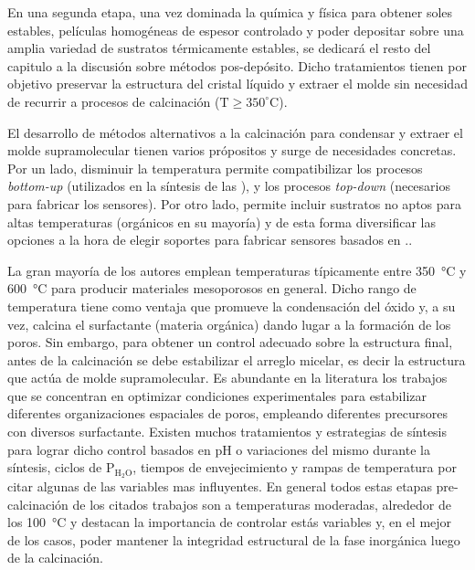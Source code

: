 	En una segunda etapa, una vez dominada la química y física para obtener soles estables, películas homogéneas de espesor controlado y poder depositar sobre una amplia variedad de sustratos térmicamente estables, se dedicará el resto del capitulo a la discusión sobre métodos pos-depósito. Dicho tratamientos tienen por objetivo preservar la estructura del cristal líquido y extraer el molde sin necesidad de recurrir a procesos de calcinación ($\text{T} \geq 350^\circ \text{C}$).

	El desarrollo de métodos alternativos a la calcinación para condensar y extraer el molde supramolecular tienen varios própositos y surge de necesidades concretas. Por un lado, disminuir la temperatura permite compatibilizar los procesos \textit{bottom-up} (utilizados en la síntesis de las \pdm), y los procesos \textit{top-down} (necesarios para fabricar los sensores). Por otro lado, permite incluir sustratos no aptos para altas temperaturas (orgánicos en su mayoría) y de esta forma diversificar las opciones a la hora de elegir soportes para fabricar sensores basados en \pdm.\cite{Doshi2000a,Wagner2013,Innocenzi2013,Soler-Illia2002a,Zhang2005}.

	La gran mayoría de los autores emplean temperaturas típicamente entre \SI{350}{\celsius} y \SI{600}{\celsius} para producir materiales mesoporosos en general. Dicho rango de temperatura tiene como ventaja que promueve la condensación del óxido y, a su vez, calcina el surfactante (materia orgánica) dando lugar a la formación de los poros.\cite{Kresge1992,Beck1992,DiRenzo1997}  Sin embargo, para obtener un control adecuado sobre la estructura final, antes de la calcinación se debe estabilizar el arreglo micelar, es decir la estructura que actúa de molde supramolecular. Es abundante en la literatura los trabajos que se concentran en optimizar condiciones experimentales para estabilizar diferentes organizaciones espaciales de poros, empleando diferentes precursores con diversos surfactante\cite{Huo1996,Herregods2013,Grosso2001}. Existen muchos tratamientos y estrategias de síntesis para lograr dicho control basados en pH o variaciones del mismo durante la síntesis\cite{Doshi2000a,Soler-Illia2011,Boissiere2000,Huo1996,GonzalezSolveyra2017,Ichinose2002}, ciclos de P$_\text{H$_2$O}$\cite{Cagnol2002,Soler-Illia2012}, tiempos de envejecimiento\cite{Malfatti2009,Grosso2001} y rampas de temperatura\cite{Huang2002,Andrini2016,Soler-Illia2006,Rohlfing2005} por citar algunas de las variables mas influyentes. En general todos estas etapas pre-calcinación de los citados trabajos son a temperaturas moderadas, alrededor de los \SI{100}{\celsius} y destacan la importancia de controlar estás variables y, en el mejor de los casos, poder mantener la integridad estructural de la fase inorgánica luego de la calcinación. 

